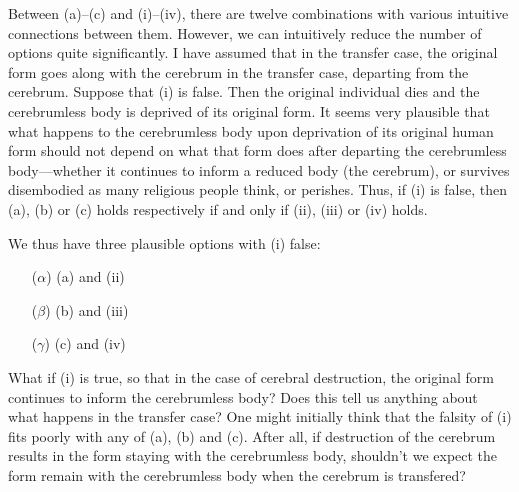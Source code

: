 Between (a)--(c) and (i)--(iv), there are twelve combinations with various intuitive connections between them. 
However, we can intuitively reduce the number of options quite significantly. I have assumed that in the transfer
case, the original form goes along with the cerebrum in the transfer case, departing from the cerebrum. Suppose that
(i) is false. Then the original individual dies and the cerebrumless body is deprived of its original form. It seems
very plausible that what happens to the cerebrumless body upon deprivation of its original human form should not depend
on what that form does after departing the cerebrumless body---whether it continues to inform a reduced body (the cerebrum), 
or survives disembodied as many religious people think, or perishes. Thus, if (i) is false, then (a), (b) or (c) holds
respectively if and only if (ii), (iii) or (iv) holds. 

We thus have three plausible options with (i) false:
\begin{itemize}
\item[($\alpha$)] (a) and (ii)
\item[($\beta$)] (b) and (iii)
\item[($\gamma$)] (c) and (iv)
\end{itemize}

What if (i) is true, so that in the case of cerebral destruction, the original form continues to inform the cerebrumless body? 
Does this  tell us anything about what happens in the transfer case? One might initially think that the falsity of (i) fits
poorly with any of (a), (b) and (c). After all, if destruction of the cerebrum results in the form staying with the cerebrumless
body, shouldn't we expect the form remain with the cerebrumless body when the cerebrum is transfered?

